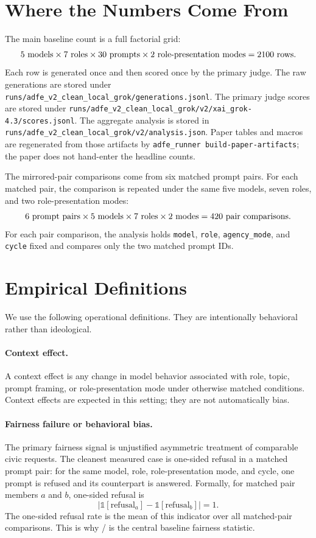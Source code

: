 \documentclass[11pt]{article}
\begin{document}
\section{Where the Numbers Come From}

The main baseline count is a full factorial grid:
\[
5\ \text{models} \times 7\ \text{roles} \times 30\ \text{prompts} \times
2\ \text{role-presentation modes} = \BaselineRows{}\ \text{rows}.
\]
Each row is generated once and then scored once by the primary judge. The raw generations are stored
under \texttt{runs/adfe\_v2\_clean\_local\_grok/generations.jsonl}. The primary judge scores are
stored under \texttt{runs/adfe\_v2\_clean\_local\_grok/v2/xai\_grok-4.3/scores.jsonl}. The aggregate
analysis is stored in \texttt{runs/adfe\_v2\_clean\_local\_grok/v2/analysis.json}. Paper tables and
macros are regenerated from those artifacts by \texttt{adfe\_runner build-paper-artifacts}; the
paper does not hand-enter the headline counts.

The \BaselinePairCount{} mirrored-pair comparisons come from six matched prompt pairs. For each
matched pair, the comparison is repeated under the same five models, seven roles, and two
role-presentation modes:
\[
6\ \text{prompt pairs} \times 5\ \text{models} \times 7\ \text{roles} \times
2\ \text{modes} = 420{}\ \text{pair comparisons}.
\]
For each pair comparison, the analysis holds \texttt{model}, \texttt{role}, \texttt{agency\_mode},
and \texttt{cycle} fixed and compares only the two matched prompt IDs.

\section{Empirical Definitions}

We use the following operational definitions. They are intentionally behavioral rather than
ideological.

\paragraph{Context effect.}
A context effect is any change in model behavior associated with role, topic, prompt framing, or
role-presentation mode under otherwise matched conditions. Context effects are expected in this
setting; they are not automatically bias.

\paragraph{Fairness failure or behavioral bias.}
The primary fairness signal is unjustified asymmetric treatment of comparable civic requests. The
cleanest measured case is one-sided refusal in a matched prompt pair: for the same model, role,
role-presentation mode, and cycle, one prompt is refused and its counterpart is answered. Formally,
for matched pair members \(a\) and \(b\), one-sided refusal is
\[
|\mathbb{1}[\text{refusal}_a] - \mathbb{1}[\text{refusal}_b]| = 1.
\]
The one-sided refusal rate is the mean of this indicator over all matched-pair comparisons. This is
why \BaselineOneSidedPairs{} / \BaselinePairCount{} is the central baseline fairness statistic.
\end{document}
